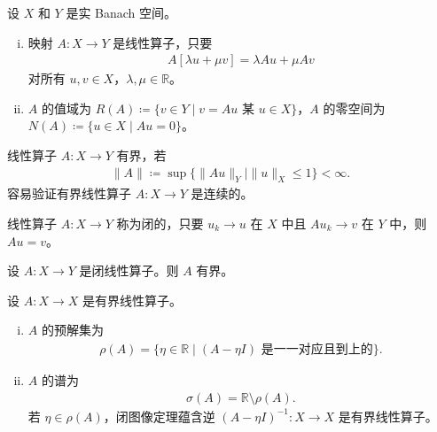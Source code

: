 \documentclass[../main.tex]{subfiles}
\begin{document}
设 $X$ 和 $Y$ 是实 Banach 空间。

\begin{definition}\label{definition:appD-线性算子}
\begin{enumerate}[(i)]
\item 映射 $A:X\to Y$ 是线性算子，只要
\begin{align*}
A[\lambda u+\mu v]=\lambda Au+\mu Av
\end{align*}
对所有 $u,v\in X$，$\lambda,\mu\in\mathbb{R}$。

\item $A$ 的值域为 $R(A)\coloneqq\{v\in Y\mid v=Au\text{ 某 }u\in X\}$，$A$ 的零空间为 $N(A)\coloneqq\{u\in X\mid Au=0\}$。
\end{enumerate}
\end{definition}

\begin{definition}\label{definition:appD-有界算子}
线性算子 $A:X\to Y$ 有界，若
\begin{align*}
\|A\|\coloneqq\sup\{\|Au\|_Y\mid\|u\|_X\leqslant 1\}<\infty.
\end{align*}
容易验证有界线性算子 $A:X\to Y$ 是连续的。
\end{definition}

\begin{definition}\label{definition:appD-闭算子}
线性算子 $A:X\to Y$ 称为闭的，只要 $u_k\to u$ 在 $X$ 中且 $Au_k\to v$ 在 $Y$ 中，则 $Au=v$。
\end{definition}

\begin{theorem}[闭图像定理。]\label{theorem:appD-闭图像}设 $A:X\to Y$ 是闭线性算子。则 $A$ 有界。
\end{theorem}

\begin{definition}\label{definition:appD-谱}
设 $A:X\to X$ 是有界线性算子。
\begin{enumerate}[(i)]
\item $A$ 的预解集为
\begin{align*}
\rho(A)=\{\eta\in\mathbb{R}\mid(A-\eta I)\text{ 是一一对应且到上的}\}.
\end{align*}
\item $A$ 的谱为
\begin{align*}
\sigma(A)=\mathbb{R}\setminus\rho(A).
\end{align*}
若 $\eta\in\rho(A)$，闭图像定理蕴含逆 $(A-\eta I)^{-1}:X\to X$ 是有界线性算子。
\end{enumerate}
\end{definition}
\end{document}
